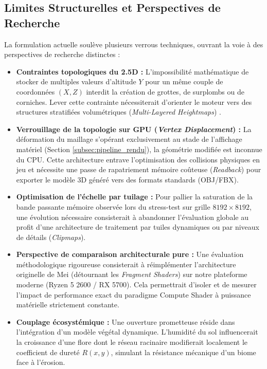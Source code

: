 \documentclass[10pt,twocolumn,a4paper]{article}
\begin{document}
\subsection{Limites Structurelles et Perspectives de Recherche}\label{subsec:limites}
La formulation actuelle soulève plusieurs verrous techniques, ouvrant la voie à des perspectives de recherche distinctes :
\begin{itemize}
    \item \textbf{Contraintes topologiques du 2.5D :} L'impossibilité mathématique de stocker de multiples valeurs d'altitude $Y$ pour un même couple de coordonnées $(X,Z)$ interdit la création de grottes, de surplombs ou de corniches. Lever cette contrainte nécessiterait d'orienter le moteur vers des structures stratifiées volumétriques (\textit{Multi-Layered Heightmaps}) \cite{Nilles24}.
    \item \textbf{Verrouillage de la topologie sur GPU (\textit{Vertex Displacement}) :} La déformation du maillage s'opérant exclusivement au stade de l'affichage matériel (Section \ref{subsec:pipeline_rendu}), la géométrie modifiée est inconnue du CPU. Cette architecture entrave l'optimisation des collisions physiques en jeu et nécessite une passe de rapatriement mémoire coûteuse (\textit{Readback}) pour exporter le modèle 3D généré vers des formats standards (OBJ/FBX).
    \item \textbf{Optimisation de l'échelle par tuilage :} Pour pallier la saturation de la bande passante mémoire observée lors du stress-test sur grille $8192 \times 8192$, une évolution nécessaire consisterait à abandonner l'évaluation globale au profit d'une architecture de traitement par tuiles dynamiques ou par niveaux de détails (\textit{Clipmaps}).
    \item \textbf{Perspective de comparaison architecturale pure :} Une évaluation méthodologique rigoureuse consisterait à réimplémenter l'architecture originelle de Mei (détournant les \textit{Fragment Shaders}) sur notre plateforme moderne (Ryzen 5 2600 / RX 5700). Cela permettrait d'isoler et de mesurer l'impact de performance exact du paradigme Compute Shader à puissance matérielle strictement constante.
    \item \textbf{Couplage écosystémique :} Une ouverture prometteuse réside dans l'intégration d'un modèle végétal dynamique. L'humidité du sol influencerait la croissance d'une flore dont le réseau racinaire modifierait localement le coefficient de dureté $R(x,y)$, simulant la résistance mécanique d'un biome face à l'érosion.
\end{itemize}
\end{document}
